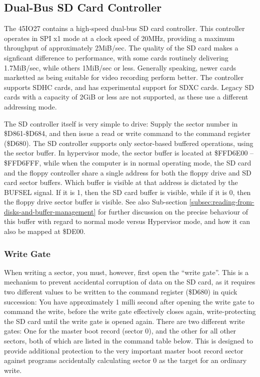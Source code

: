 \subsection{Dual-Bus SD Card Controller}

The 45IO27 contains a high-speed dual-bus SD card controller.  This
controller operates in SPI x1 mode at a clock speed of 20MHz,
providing a maximum throughput of approximately 2MiB/sec.  The quality
of the SD card makes a signficant difference to performance, with some
cards routinely delivering 1.7MiB/sec, while others 1MiB/sec or
less. Generally speaking, newer cards marketted as being suitable for
video recording perform better.  The controller supports SDHC cards,
and has experimental support for SDXC cards.  Legacy SD cards with a
capacity of 2GiB or less are not supported, as these use a different
addressing mode.

The SD controller itself is very simple to drive: Supply the sector
number in \$D861-\$D684, and then issue a read or write command to the
command register (\$D680).  The SD controller supports only
sector-based buffered operations, using the sector buffer. In
hypervisor mode, the sector buffer is located at \$FFD6E00 --
\$FFD6FFF, while when the computer is in normal operating mode, the SD
card and the floppy controller share a single address for both the
floppy drive and SD card sector buffers. Which buffer is visible at
that address is dictated by the BUFSEL signal. If it is 1, then the SD
card buffer is visible, while if it is 0, then the floppy drive sector
buffer is visible.  See also Sub-section
\vref{subsec:reading-from-disks-and-buffer-management} for further
discussion on the precise behaviour of this buffer with regard to
normal mode versus Hypervisor mode, and how it can also be mapped at
\$DE00. 

\subsubsection{Write Gate}

When writing a sector, you must, however, first open the ``write
gate''. This is a mechanism to prevent accidental corruption of data
on the SD card, as it requires two different values to be written to
the command register (\$D680) in quick succession: You have
approximately 1 milli second after opening the write gate to command
the write, before the write gate effectively closes again,
write-protecting the SD card until the write gate is opened again.
There are two different write gates: One for the master boot record
(sector 0), and the other for all other sectors, both of which are
listed in the command table below. This is designed to provide
additional protection to the very important master boot record sector
against programs accidentally calculating sector 0 as the target for
an ordinary write.

